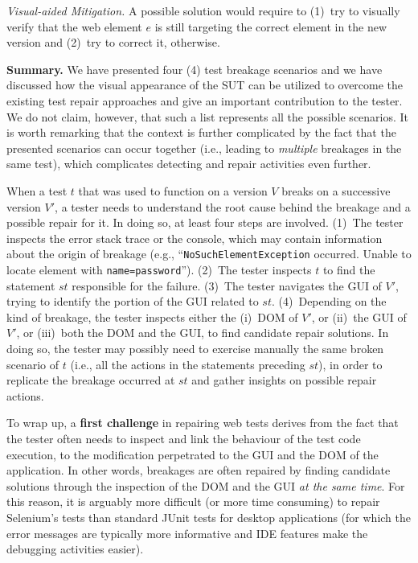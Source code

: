 \noindent
\textit{Visual-aided Mitigation.}
A possible solution would require to (1)~try to visually verify that the web element $e$ is still targeting the correct element in the new version and (2)~try to correct it, otherwise.

\noindent
\textbf{Summary.}
We have presented four (4) test breakage scenarios and we have discussed how the visual appearance of the SUT can be utilized to overcome the existing test repair approaches and give an important contribution to the tester. We do not claim, however, that such a list represents all the possible scenarios. It is worth remarking that the context is further complicated by the fact that the presented scenarios can occur together (i.e., leading to \textit{multiple} breakages in the same test), which complicates detecting and repair activities even further.

%
When a test $t$ that was used to function on a version $V$  breaks on a successive version $V'$, a tester needs to understand the root cause behind the breakage and a possible repair for it. 
%
In doing so, at least four steps are involved. 
(1)~The tester inspects the error stack trace or the console, which may contain information about the origin of breakage (e.g., ``\texttt{NoSuchElementException} occurred. Unable to locate element with \mbox{\texttt{name=password}}''). 
(2)~The tester inspects $t$ to find the statement $st$ responsible for the failure. %
(3)~The tester navigates the GUI of $V'$, trying to identify the portion of the GUI related to $st$. 
(4)~Depending on the kind of breakage, the tester inspects either the (i)~DOM of $V'$, or (ii)~the GUI of $V'$, or (iii)~both the DOM and the GUI, to find candidate repair solutions. In doing so, the tester may possibly need to exercise manually the same broken scenario of $t$ (i.e., all the actions in the statements preceding $st$), in order to replicate the breakage occurred at $st$ and gather insights on possible repair actions.

To wrap up, a \textbf{first challenge} in repairing web tests derives from the fact that  
the tester often needs to inspect and link the behaviour of the test code execution, to the modification perpetrated to the GUI and the DOM of the application. 
In other words, breakages are often repaired by finding candidate solutions through the inspection of the DOM and the GUI \textit{at the same time}.
For this reason, it is arguably more difficult (or more time consuming) to repair Selenium's tests than standard JUnit tests for desktop applications (for which the error messages are typically more informative and IDE features make the debugging activities easier).

